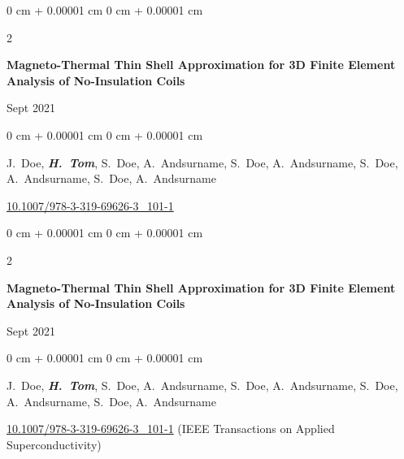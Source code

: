 \documentclass[10pt, letterpaper]{article}
\newenvironment{onecolentry}{
    \begin{adjustwidth}{
        0 cm + 0.00001 cm
    }{
        0 cm + 0.00001 cm
    }
}{
    \end{adjustwidth}
} %
\newenvironment{twocolentry}[2][]{
    \onecolentry
    \def\secondColumn{#2}
    \setcolumnwidth{\fill, 4.5 cm}
    \begin{paracol}{2}
}{
    \switchcolumn \raggedleft \secondColumn
    \end{paracol}
    \endonecolentry
} %
\begin{document}
        \vspace{0.2 cm}

        \begin{samepage}
            \begin{twocolentry}{
                Sept 2021
            }
                \textbf{Magneto-Thermal Thin Shell Approximation for 3D Finite Element Analysis of No-Insulation Coils}
            \end{twocolentry}

            \vspace{0.10 cm}
            
            \begin{onecolentry}
                \mbox{J. Doe}, \mbox{\textbf{\textit{H. Tom}}}, \mbox{S. Doe}, \mbox{A. Andsurname}, \mbox{S. Doe}, \mbox{A. Andsurname}, \mbox{S. Doe}, \mbox{A. Andsurname}, \mbox{S. Doe}, \mbox{A. Andsurname}

                \vspace{0.10 cm}
                
        \href{https://doi.org/10.1007/978-3-319-69626-3_101-1}{10.1007/978-3-319-69626-3\_101-1}
        \end{onecolentry}
        \end{samepage}

        \vspace{0.2 cm}

        \begin{samepage}
            \begin{twocolentry}{
                Sept 2021
            }
                \textbf{Magneto-Thermal Thin Shell Approximation for 3D Finite Element Analysis of No-Insulation Coils}
            \end{twocolentry}

            \vspace{0.10 cm}
            
            \begin{onecolentry}
                \mbox{J. Doe}, \mbox{\textbf{\textit{H. Tom}}}, \mbox{S. Doe}, \mbox{A. Andsurname}, \mbox{S. Doe}, \mbox{A. Andsurname}, \mbox{S. Doe}, \mbox{A. Andsurname}, \mbox{S. Doe}, \mbox{A. Andsurname}

                \vspace{0.10 cm}
                
        \href{https://doi.org/10.1007/978-3-319-69626-3_101-1}{10.1007/978-3-319-69626-3\_101-1}
         (IEEE Transactions on Applied Superconductivity)\end{onecolentry}
        \end{samepage}
\end{document}
